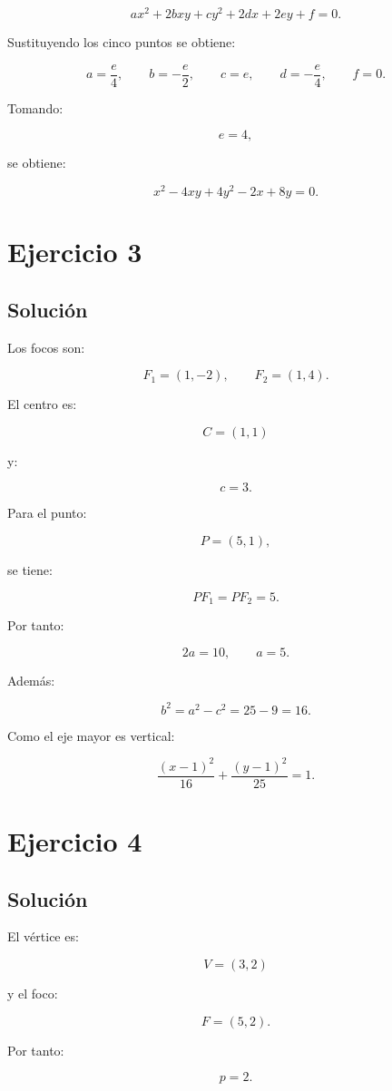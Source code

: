 \documentclass[11pt,a4paper]{article}
\begin{document}
\[
ax^2+2bxy+cy^2+2dx+2ey+f=0.
\]

Sustituyendo los cinco puntos se obtiene:

\[
a=\frac e4,
\qquad
b=-\frac e2,
\qquad
c=e,
\qquad
d=-\frac e4,
\qquad
f=0.
\]

Tomando:

\[
e=4,
\]

se obtiene:

\[
\boxed{
x^2-4xy+4y^2-2x+8y=0.
}
\]

\section{Ejercicio 3}
\subsection{Solución}

Los focos son:

\[
F_1=(1,-2),
\qquad
F_2=(1,4).
\]

El centro es:

\[
C=(1,1)
\]

y:

\[
c=3.
\]

Para el punto:

\[
P=(5,1),
\]

se tiene:

\[
PF_1=PF_2=5.
\]

Por tanto:

\[
2a=10,
\qquad
a=5.
\]

Además:

\[
b^2=a^2-c^2=25-9=16.
\]

Como el eje mayor es vertical:

\[
\boxed{
\frac{(x-1)^2}{16}
+
\frac{(y-1)^2}{25}
=
1.
}
\]

\section{Ejercicio 4}
\subsection{Solución}

El vértice es:

\[
V=(3,2)
\]

y el foco:

\[
F=(5,2).
\]

Por tanto:

\[
p=2.
\]
\end{document}
